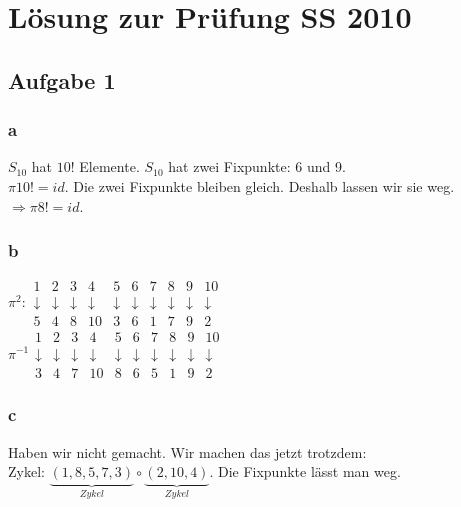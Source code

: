 \renewcommand{\ldate}{2015-06-15}	%

% 

\section{Lösung zur Prüfung SS 2010}

\subsection{Aufgabe 1}

\subsubsection{a} $S_{10}$ hat $10!$ Elemente. $S_{10}$ hat zwei Fixpunkte: 6 und 9. \\
$\pi{10!}=id$. Die zwei Fixpunkte bleiben gleich. Deshalb lassen wir sie weg. $\Rightarrow \pi{8!}=id$.

\subsubsection{b}
$\pi^2: 
\begin{array}{cccccccccc}
1 & 2 & 3 & 4 & 5 & 6 & 7 & 8 & 9 & 10 \\ 
\downarrow & \downarrow & \downarrow & \downarrow & \downarrow & \downarrow & \downarrow & \downarrow & \downarrow & \downarrow \\ 
5 & 4 & 8 & 10 & 3 & 6 & 1 & 7 & 9 & 2
\end{array} 
$
\\
$\pi^{-1}
\begin{array}{cccccccccc}
1 & 2 & 3 & 4 & 5 & 6 & 7 & 8 & 9 & 10 \\ 
\downarrow & \downarrow & \downarrow & \downarrow & \downarrow & \downarrow & \downarrow & \downarrow & \downarrow & \downarrow \\ 
3 & 4 & 7 & 10 & 8 & 6 & 5 & 1 & 9 & 2
\end{array} 
$
\subsubsection{c} Haben wir nicht gemacht. Wir machen das jetzt trotzdem:\\
Zykel: $\underbrace{(1,8,5,7,3)}_{Zykel} \circ \underbrace{(2,10,4)}_{Zykel}$. Die Fixpunkte lässt man weg. 

